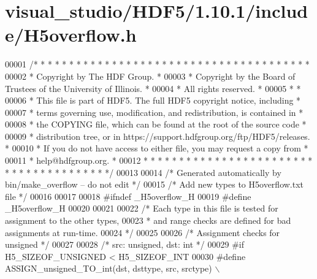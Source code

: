 \hypertarget{visual__studio_2_h_d_f5_21_810_81_2include_2_h5overflow_8h_source}{}\section{visual\+\_\+studio/\+H\+D\+F5/1.10.1/include/\+H5overflow.h}
\label{visual__studio_2_h_d_f5_21_810_81_2include_2_h5overflow_8h_source}

\begin{DoxyCode}
00001 \textcolor{comment}{/* * * * * * * * * * * * * * * * * * * * * * * * * * * * * * * * * * * * * * *}
00002 \textcolor{comment}{ * Copyright by The HDF Group.                                               *}
00003 \textcolor{comment}{ * Copyright by the Board of Trustees of the University of Illinois.         *}
00004 \textcolor{comment}{ * All rights reserved.                                                      *}
00005 \textcolor{comment}{ *                                                                           *}
00006 \textcolor{comment}{ * This file is part of HDF5.  The full HDF5 copyright notice, including     *}
00007 \textcolor{comment}{ * terms governing use, modification, and redistribution, is contained in    *}
00008 \textcolor{comment}{ * the COPYING file, which can be found at the root of the source code       *}
00009 \textcolor{comment}{ * distribution tree, or in https://support.hdfgroup.org/ftp/HDF5/releases.  *}
00010 \textcolor{comment}{ * If you do not have access to either file, you may request a copy from     *}
00011 \textcolor{comment}{ * help@hdfgroup.org.                                                        *}
00012 \textcolor{comment}{ * * * * * * * * * * * * * * * * * * * * * * * * * * * * * * * * * * * * * * */}
00013 
00014 \textcolor{comment}{/* Generated automatically by bin/make\_overflow -- do not edit */}
00015 \textcolor{comment}{/* Add new types to H5overflow.txt file */}
00016 
00017 
00018 \textcolor{preprocessor}{#ifndef \_H5overflow\_H}
00019 \textcolor{preprocessor}{#define \_H5overflow\_H}
00020 
00021 
00022 \textcolor{comment}{/* Each type in this file is tested for assignment to the other types,}
00023 \textcolor{comment}{ *      and range checks are defined for bad assignments at run-time.}
00024 \textcolor{comment}{ */}
00025 
00026 \textcolor{comment}{/* Assignment checks for unsigned */}
00027 
00028 \textcolor{comment}{/* src: unsigned, dst: int */}
00029 \textcolor{preprocessor}{#if H5\_SIZEOF\_UNSIGNED < H5\_SIZEOF\_INT}
00030 \textcolor{preprocessor}{    #define ASSIGN\_unsigned\_TO\_int(dst, dsttype, src, srctype) \(\backslash\)}

\end{DoxyCode}
